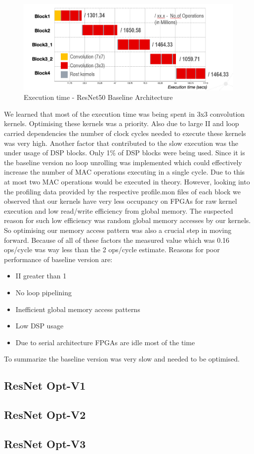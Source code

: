 \begin{figure}[!htb]
  \includegraphics[width=\textwidth,height=\textheight,keepaspectratio]{img/ResNet_baseline_execution.png}
  \caption{Execution time - ResNet50 Baseline Architecture}
  \label{fig:ResNet50_baseline_time}
\end{figure}
We learned that most of the execution time was being spent in 3x3 convolution kernels. Optimising these kernels was a priority. Also due to large II and loop carried dependencies the number of clock cycles needed to execute these kernels was very high. Another factor that contributed to the slow execution was the under usage of DSP blocks. Only 1\% of DSP blocks were being used. Since it is the baseline version no loop unrolling was implemented which could effectively increase the number of MAC operations executing in a single cycle. Due to this at most two MAC operations would be executed in theory. However, looking into the profiling data provided by the respective profile.mon files of each block we observed that our kernels have very less occupancy on FPGAs for raw kernel execution and low read/write efficiency from global memory. The suspected reason for such low efficiency was random global memory accesses by our kernels. So optimising our memory access pattern was also a crucial step in moving forward. Because of all of these factors the measured value which was 0.16 ops/cycle was way less than the 2 ops/cycle estimate.
\newline
Reasons for poor performance of baseline version are:
\begin{itemize}
    \item II greater than 1 
    \item No loop pipelining
    \item Inefficient global memory access patterns
    \item Low DSP usage
    \item Due to serial architecture FPGAs are idle most of the time
\end{itemize}
To summarize the baseline version was very slow and needed to be optimised.

\subsection{ResNet Opt-V1}
\subsection{ResNet Opt-V2}
\subsection{ResNet Opt-V3}
